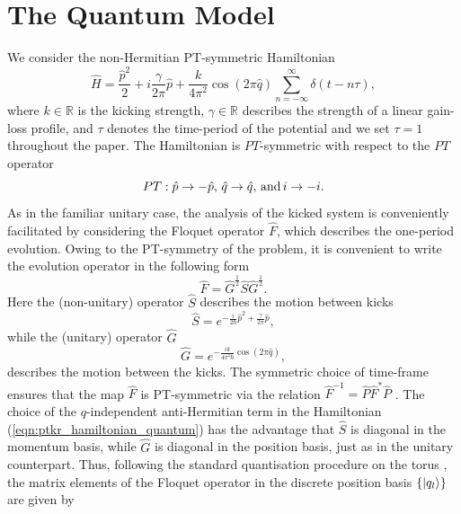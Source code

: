 \documentclass{iopart}
\begin{document}
	\section{The Quantum Model}
	We consider the non-Hermitian PT-symmetric Hamiltonian
	\begin{equation}
		\label{eqn:ptkr_hamiltonian_quantum}
		\hat{H}=\frac{\hat{p}^2}{2}+i\frac{\gamma}{2\pi}\hat{p}+\frac{k}{4\pi^2}\cos(2\pi \hat{q})\sum_{n=-\infty}^{\infty}\delta(t-n\tau),
	\end{equation}
	where $k\in\mathbb{R}$ is the kicking strength, $\gamma\in\mathbb{R}$ describes the strength of a linear gain-loss profile, and $\tau$ denotes the time-period of the potential and we set $\tau=1$ throughout the paper. The Hamiltonian is $PT$-symmetric with respect to the $PT$ operator
	\begin{equation}
		PT: \hat p\to -\hat p, \, \hat q\to\hat q,\,{\rm and}\, i\to-i.
	\end{equation}
	As in the familiar unitary case, the analysis of the kicked system is conveniently facilitated by considering the Floquet operator $\hat{F}$, which describes the one-period evolution. Owing to the PT-symmetry of the problem, it is convenient to write the evolution operator in the following form \cite{Henning_2003_Shot_Noise,Ketz_2018,Butusov_sym_map} 
	\begin{equation}
		\label{eqn:flouqet_map_form}
		\hat{F}=\hat{G}^{\frac{1}{2}}\hat{S}\hat{G}^{\frac{1}{2}}.
	\end{equation}
	Here the (non-unitary) operator $\hat{S}$ describes the motion between kicks 
	\begin{equation}
		\hat{S}=e^{-\frac{i}{2\hbar}\hat{p}^2+\frac{\gamma}{2\pi}\hat{p}},
	\end{equation}
	while the (unitary) operator $\hat{G}$ 
	\begin{equation}
		\hat{G}=e^{-\frac{ik}{4\pi^2\hbar}\cos(2\pi\hat{q})},
	\end{equation}
	describes the motion between the kicks. The symmetric choice of time-frame ensures that the map $\hat{F}$ is PT-symmetric via the relation $\hat F^{-1}=\hat{P}\hat F^* \hat{P} $ \cite{Janos_2013,Jones_2010}. 
	The choice of the $q$-independent anti-Hermitian term in the  Hamiltonian (\ref{eqn:ptkr_hamiltonian_quantum}) has the advantage that $\hat{S}$ is diagonal in the momentum basis, while $\hat{G}$ is diagonal in the position basis, just as in the unitary counterpart. Thus, following the standard quantisation procedure on the torus \cite{Izrailev_1988_Torus_Model,Tracy_2002,Torre_2003}, the matrix elements of the Floquet operator in the discrete position basis $\lbrace\ket{q_l}\rbrace$ are given by 
\end{document}
